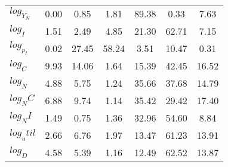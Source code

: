 \begin{center}
\begin{longtable}{lcccccc}
$log_Y_N   $	 & 	        0.00	 & 	        0.85	 & 	        1.81	 & 	       89.38	 & 	        0.33	 & 	        7.63 \\ 
$log_I     $	 & 	        1.51	 & 	        2.49	 & 	        4.85	 & 	       21.30	 & 	       62.71	 & 	        7.15 \\ 
$log_p_I   $	 & 	        0.02	 & 	       27.45	 & 	       58.24	 & 	        3.51	 & 	       10.47	 & 	        0.31 \\ 
$log_C     $	 & 	        9.93	 & 	       14.06	 & 	        1.64	 & 	       15.39	 & 	       42.45	 & 	       16.52 \\ 
$log_N     $	 & 	        4.88	 & 	        5.75	 & 	        1.24	 & 	       35.66	 & 	       37.68	 & 	       14.79 \\ 
$log_NC    $	 & 	        6.88	 & 	        9.74	 & 	        1.14	 & 	       35.42	 & 	       29.42	 & 	       17.40 \\ 
$log_NI    $	 & 	        1.49	 & 	        0.75	 & 	        1.36	 & 	       32.96	 & 	       54.60	 & 	        8.84 \\ 
$log_util  $	 & 	        2.66	 & 	        6.76	 & 	        1.97	 & 	       13.47	 & 	       61.23	 & 	       13.91 \\ 
$log_D     $	 & 	        4.58	 & 	        5.39	 & 	        1.16	 & 	       12.49	 & 	       62.52	 & 	       13.87 \\ 
\end{longtable}
 \end{center}
